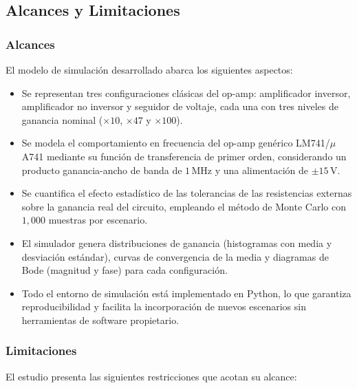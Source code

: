 ﻿\documentclass[12pt, letterpaper]{article}
\begin{document}
\subsection{Alcances y Limitaciones}

\subsubsection*{Alcances}

El modelo de simulación desarrollado abarca los siguientes aspectos:

\begin{itemize}[leftmargin=2em]
    \item Se representan tres configuraciones clásicas del op-amp: amplificador
          inversor, amplificador no inversor y seguidor de voltaje, cada una con
          tres niveles de ganancia nominal (\(\times 10\), \(\times 47\) y
          \(\times 100\)).
    \item Se modela el comportamiento en frecuencia del op-amp genérico
          LM741/\(\mu\)A741 mediante su función de transferencia de primer orden, %
          considerando un producto ganancia\nobreakdash-ancho de banda de
          \(1\,\text{MHz}\) y una alimentación de \(\pm 15\,\text{V}\).
    \item Se cuantifica el efecto estadístico de las tolerancias de las
          resistencias externas sobre la ganancia real del circuito, empleando el
          método de Monte Carlo con \(1{,}000\) muestras por escenario.
    \item El simulador genera distribuciones de ganancia (histogramas con media
          y desviación estándar), curvas de convergencia de la media y diagramas
          de Bode (magnitud y fase) para cada configuración.
    \item Todo el entorno de simulación está implementado en Python, lo que
          garantiza reproducibilidad y facilita la incorporación de nuevos
          escenarios sin herramientas de software propietario.
\end{itemize}

\subsubsection*{Limitaciones}

El estudio presenta las siguientes restricciones que acotan su alcance:
\end{document}
